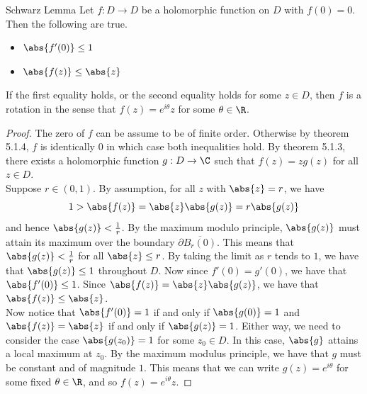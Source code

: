 \documentclass[a4paper]{article}
\begin{document}
\begin{thm}{Schwarz Lemma}{} Let $f:D\to D$ be a holomorphic function on $D$ with $f(0)=0$. Then the following are true. 
\begin{itemize}
\item $\abs{f'(0)}\leq 1$
\item $\abs{f(z)}\leq\abs{z}$
\end{itemize}
If the first equality holds, or the second equality holds for some $z\in D$, then $f$ is a rotation in the sense that $f(z)=e^{i\theta}z$ for some $\theta\in\R$. 
\begin{proof}
The zero of $f$ can be assume to be of finite order. Otherwise by theorem 5.1.4, $f$ is identically $0$ in which case both inequalities hold. By theorem 5.1.3, there exists a holomorphic function $g:D\to\C$ such that $f(z)=zg(z)$ for all $z\in D$. \\

Suppose $r\in(0,1)$. By assumption, for all $z$ with $\abs{z}=r$, we have $$1>\abs{f(z)}=\abs{z}\abs{g(z)}=r\abs{g(z)}$$ and hence $\abs{g(z)}<\frac{1}{r}$. By the maximum modulo principle, $\abs{g(z)}$ must attain its maximum over the boundary $\partial\overline{B_r(0)}$. This means that $\abs{g(z)}<\frac{1}{r}$ for all $\abs{z}\leq r$. By taking the limit as $r$ tends to $1$, we have that $\abs{g(z)}\leq 1$ throughout $D$. Now since $f'(0)=g'(0)$, we have that $\abs{f'(0)}\leq 1$. Since $\abs{f(z)}=\abs{z}\abs{g(z)}$, we have that $\abs{f(z)}\leq\abs{z}$. \\

Now notice that $\abs{f'(0)}=1$ if and only if $\abs{g(0)}=1$ and $\abs{f(z)}=\abs{z}$ if and only if $\abs{g(z)}=1$. Either way, we need to consider the case $\abs{g(z_0)}=1$ for some $z_0\in D$. In this case, $\abs{g}$ attains a local maximum at $z_0$. By the maximum modulus principle, we have that $g$ must be constant and of magnitude $1$. This means that we can write $g(z)=e^{i\theta}$ for some fixed $\theta\in\R$, and so $f(z)=e^{i\theta}z$. 
\end{proof}
\end{thm}
\end{document}
